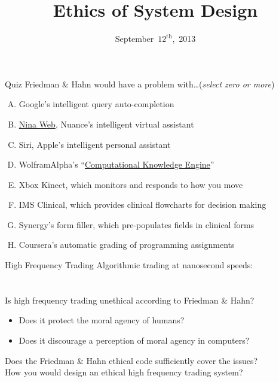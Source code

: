 \documentclass{beamer}
\title{Ethics of System Design}
\date{September~$12^{\text{th}}$,~2013}
\begin{document}
\begin{frame}
\titlepage
\end{frame}

\begin{frame}{Quiz}
Friedman \& Hahn would have a problem with\ldots \hfill (\emph{select zero or more})
\begin{enumerate}[(A)]
\item<1> Google's intelligent query auto-completion
\item<1-2> \href{http://www.nuance.com/landing-pages/products/nina/default.asp}{Nina Web}, Nuance's intelligent virtual assistant
\item<1-2> Siri, Apple's intelligent personal assistant
\item<1-2> WolframAlpha's ``\href{http://www.wolframalpha.com/}{Computational Knowledge Engine}''
\item<1> Xbox Kinect, which monitors and responds to how you move
\item<1-2> IMS Clinical, which provides clinical flowcharts for decision making
\item<1> Synergy's form filler, which pre-populates fields in clinical forms
\item<1> Coursera's automatic grading of programming assignments
\end{enumerate}
\end{frame}

\begin{frame}{High Frequency Trading}
Algorithmic trading at nanosecond speeds: \\
\href{http://www.colbertnation.com/the-colbert-report-videos/421265/november-14-2012/high-frequency-trading}{} \\
\href{http://www.colbertnation.com/the-colbert-report-videos/421266/november-14-2012/high-frequency-trading---christopher-steiner}{} \\
\bigskip
Is high frequency trading unethical according to Friedman \& Hahn?
\begin{itemize}
\item Does it protect the moral agency of humans?
\item Does it discourage a perception of moral agency in computers?
\end{itemize}
Does the Friedman \& Hahn ethical code sufficiently cover the issues? \\
\bigskip
\pause
How you would design an ethical high frequency trading system?
\end{frame}
\end{document}
